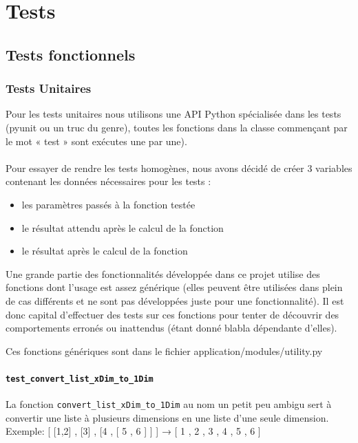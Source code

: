 \documentclass[16pts]{report}
\begin{document}
\chapter{Tests}
\label{cha:Tests}
    \section{Tests fonctionnels}
    \label{sec:Tests fonctionnels}

\subsection{Tests Unitaires}

Pour les tests unitaires nous utilisons une API Python spécialisée dans les 
tests (pyunit ou un truc du genre), toutes les fonctions dans la classe 
commençant par le mot « test » sont exécutes une par une).\\
\\
Pour essayer de rendre les tests homogènes, nous avons décidé de créer 3 
variables contenant les données nécessaires pour les tests :\\

\begin{itemize}
    \item les paramètres passés à la fonction testée
    \item le résultat attendu après le calcul de la fonction
    \item le résultat après le calcul de la fonction
\end{itemize}

Une grande partie des fonctionnalités développée dans ce projet utilise 
des fonctions dont l'usage est assez générique (elles peuvent être utilisées
dans plein de cas différents et ne sont pas développées juste pour une 
fonctionnalité). Il est donc capital d'effectuer des tests sur ces fonctions
pour tenter de découvrir des comportements erronés ou inattendus 
(étant donné blabla dépendante d'elles).

Ces fonctions génériques sont dans le fichier application/modules/utility.py

\subsubsection{\texttt{test\_convert\_list\_xDim\_to\_1Dim}}

La fonction \verb|convert_list_xDim_to_1Dim| au nom un petit peu ambigu sert à 
convertir une liste à plusieurs dimensions en une liste d'une seule dimension.
\\
Exemple: [ [1,2] , [3] , [4 , [ 5 , 6 ] ] ] → [ 1 , 2 , 3 , 4 , 5 , 6 ]\\
\end{document}
